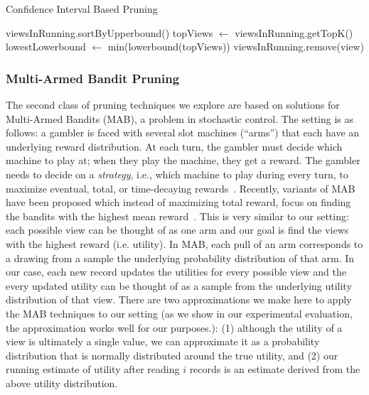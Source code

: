 \begin{algorithm}
\caption{Confidence Interval Based Pruning}
\label{algo:ci_based_pruning}
\begin{algorithmic}[1]
\State viewsInRunning.sortByUpperbound()
\State topViews $\gets$ viewsInRunning.getTopK()
\State lowestLowerbound $\gets$ min(lowerbound(topViews))
\State viewsInRunning.remove(view)
\EndIf
\EndFor
\end{algorithmic}
\end{algorithm}

\subsubsection{Multi-Armed Bandit Pruning}
\label{sec:multi_armed_bandit}
The second class of pruning techniques we explore
are based on solutions for Multi-Armed Bandits (MAB), a problem 
in stochastic control. 
The setting is as follows: 
a gambler is faced with several slot
machines (``arms'') that each have an underlying reward
distribution. 
At each turn, the gambler must decide which machine
to play at; when they play the machine, they get a reward.
The gambler needs to decide on a {\em strategy}, i.e.,
which machine to play during every turn, to maximize
eventual, total, or time-decaying rewards~\cite{bandits}.
Recently, variants of MAB have been proposed 
which instead of maximizing total reward, 
focus on finding the bandits with the highest mean reward~\cite{BubeckWV13}.
This is very similar to our setting: each possible view can be thought of as
one arm and our goal is find the views with the highest reward (i.e.
utility).
In MAB, each pull of an arm corresponds to a drawing from a sample
the underlying probability distribution of that arm.
In our case, each new record updates the utilities for every possible view and
the every updated utility can be thought of as a sample from the underlying
utility distribution of that view.
There are two approximations we make here to apply the MAB techniques
to our setting
(as we show in our experimental evaluation,
the approximation works well
for our purposes.): 
(1) although the utility of a
view is ultimately a single value, we can approximate it as a probability
distribution that is normally distributed around the true utility, and 
(2) our running estimate of utility after reading $i$
records is an estimate derived from the above utility distribution.

